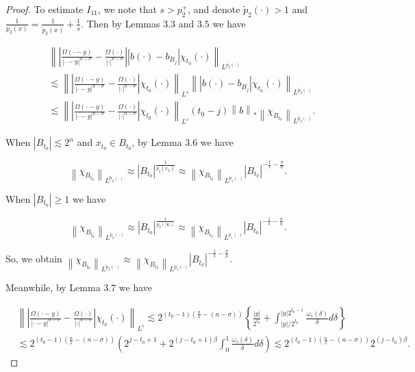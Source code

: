 \documentclass[oneside,reqno]{amsart}
\numberwithin{equation}{section}
\theoremstyle{definition}
\begin{document}
\begin{proof}
To estimate $I_{11}$, we note that $s>p_{2}^{+}$, and denote $\tilde{p}_{2}(\cdot)>1$ and $\frac{1}{p_{2}(x)}=\frac{1}{\tilde{p}_{2}(x)}+\frac{1}{s}$. Then by Lemmas $3.3$ and $3.5$ we have

$$
\begin{aligned}
& \left\|\left|\frac{\Omega(\cdot-y)}{\left| \cdot-y\right|^{n-\sigma}}-\frac{\Omega(\cdot)}{|\cdot|^{n-\sigma}}\right|\left|b(\cdot)-b_{B_{j}}\right| \chi_{t_0}(\cdot)\right\|_{L^{p_{2}(\cdot)}} \\
& \lesssim\left\|\left|\frac{\Omega(\cdot-y)}{\left| \cdot-y\right|^{n-\sigma}}-\frac{\Omega(\cdot)}{|\cdot| ^{n-\sigma}}\right| \chi_{t_0}(\cdot)\right\|_{L^{s}}\left\|\left|b(\cdot)-b_{B_{j}}\right| \chi_{t_0}(\cdot) \right\|_{L^{\tilde{p}_{2}(\cdot)}} \\
& \lesssim \left\|\left|\frac{\Omega(\cdot-y)}{\left| \cdot-y\right|^{n-\sigma}}-\frac{\Omega(\cdot)}{|\cdot| ^{n-\sigma}}\right| \chi_{t_0}(\cdot)\right\|_{L^{s}}(t_0-j)\left\| b\right\|_{*}\left\| \chi_{B_{t_0}} \right\|_{L^{\tilde{p}_{2}(\cdot)}} .
\end{aligned}
$$

When $\left|B_{t_0}\right| \lesssim 2^{n}$ and $x_{t_0} \in B_{t_0}$, by Lemma $3.6$ we have

$$
\left\|\chi_{B_{t_0}}\right\|_{L^{\tilde{p}_{2}(\cdot)}} \approx\left|B_{t_0}\right|^{\frac{1}{p_{2}\left(x_{t_0}\right)}} \approx\left\|\chi_{B_{t_0}}\right\|_{L^{p_{1}(\cdot)}}\left|B_{t_0}\right|^{-\frac{1}{s}-\frac{\sigma}{n}}.
$$

When $\left|B_{t_0}\right| \geq 1$ we have

$$
\left\|\chi_{B_{t_0}}\right\|_{L^{\tilde{p}_{2}(\cdot)}} \approx\left|B_{t_0} \right|^{\frac{1}{p_{2}(\infty)}} \approx\left\|\chi_{B_{t_0}}\right\|_{L^{p_{1}(\cdot)}}\left| B_{t_0}\right|^{-\frac{1}{s}-\frac{\sigma}{n}}.
$$

So, we obtain $\left\|\chi_{B_{t_0}}\right\|_{L^{\tilde{p}_{2}(\cdot)}} \approx\left\|\chi_{B_{t_0}}\right\|_{L^{p_{1}(\cdot)}}\left|B_{t_0}\right|^{-\frac{1}{s}-\frac{\sigma}{n}}$.

Meanwhile, by Lemma $3.7$ we have

$$
\begin{aligned}
&\left\|\left|\frac{\Omega(\cdot-y)}{\left| \cdot-y\right|^{n-\sigma}}-\frac{\Omega(\cdot)}{|\cdot| ^{n-\sigma}}\right| \chi_{t_0}(\cdot)\right\|_{L^{s}} \lesssim 2^{(t_0-1)\left(\frac{n}{s}-(n-\sigma)\right)}\left\{\frac{|y|}{2^{t_0}}+\int_{|y| / 2^{t_0}}^{|y| 2^{t_0-1}} \frac{\omega_{s}(\delta)}{\delta} d \delta\right\} \\
& \lesssim 2^{(t_0-1)\left(\frac{n}{s}-(n-\sigma)\right)}\left(2^{j-t_0+1}+2^{(j-t_0+1) \beta} \int_{0}^{1} \frac{\omega_{s}(\delta)}{\delta} d \delta\right) \lesssim  2^{(t_0-1)\left(\frac{n}{s}-(n-\sigma)\right)} 2^{(j-t_0) \beta}.
\end{aligned}
$$


\end{proof}
\end{document}

